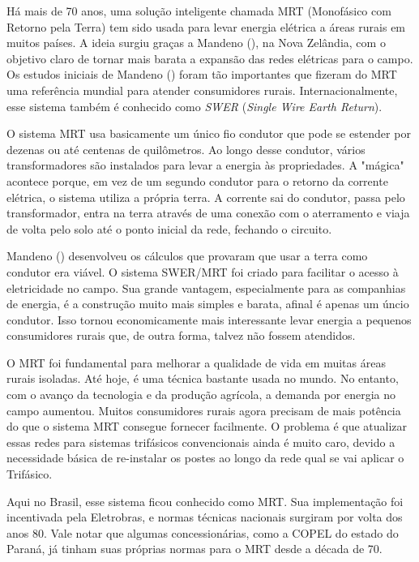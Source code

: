 \documentclass[oneside,openright,12pt]{ufsm_2021} %
\begin{document}
\par Há mais de 70 anos, uma solução inteligente chamada MRT (Monofásico com Retorno pela Terra) tem sido usada para levar energia elétrica a áreas rurais em muitos países. A ideia surgiu graças a Mandeno (\citeyear{mandeno_rural_1947}), na Nova Zelândia, com o objetivo claro de tornar mais barata a expansão das redes elétricas para o campo. Os estudos iniciais de Mandeno (\citeyear{mandeno_rural_1947}) foram tão importantes que fizeram do MRT uma referência mundial para atender consumidores rurais. Internacionalmente, esse sistema também é conhecido como \textit{SWER} (\textit{Single Wire Earth Return}).

\par O sistema MRT usa basicamente um único fio condutor que pode se estender por dezenas ou até centenas de quilômetros. Ao longo desse condutor, vários transformadores são instalados para levar a energia às propriedades. A "mágica" acontece porque, em vez de um segundo condutor para o retorno da corrente elétrica, o sistema utiliza a própria terra. A corrente sai do condutor, passa pelo transformador, entra na terra através de uma conexão com o aterramento e viaja de volta pelo solo até o ponto inicial da rede, fechando o circuito.

\par Mandeno (\citeyear{mandeno_rural_1947}) desenvolveu os cálculos que provaram que usar a terra como condutor era viável. O sistema SWER/MRT foi criado para facilitar o acesso à eletricidade no campo. Sua grande vantagem, especialmente para as companhias de energia, é a construção muito mais simples e barata, afinal é apenas um úncio condutor. Isso tornou economicamente mais interessante levar energia a pequenos consumidores rurais que, de outra forma, talvez não fossem atendidos.

\par O MRT foi fundamental para melhorar a qualidade de vida em muitas áreas rurais isoladas. Até hoje, é uma técnica bastante usada no mundo. No entanto, com o avanço da tecnologia e da produção agrícola, a demanda por energia no campo aumentou. Muitos consumidores rurais agora precisam de mais potência do que o sistema MRT consegue fornecer facilmente. O problema é que atualizar essas redes para sistemas trifásicos convencionais ainda é muito caro, devido a necessidade básica de re-instalar os postes ao longo da rede qual se vai aplicar o Trifásico.

\par Aqui no Brasil, esse sistema ficou conhecido como MRT. Sua implementação foi incentivada pela Eletrobras, e normas técnicas nacionais surgiram por volta dos anos 80. Vale notar que algumas concessionárias, como a COPEL do estado do Paraná, já tinham suas próprias normas para o MRT desde a década de 70.
\end{document}

